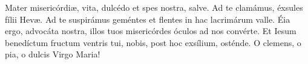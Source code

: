 Mater misericórdi{\ae}, vita, dulcédo et spes nostra, salve. Ad te clamámus, éxsules fílii Hev{\ae}.
Ad te suspirámus geméntes et flentes in hac lacrimárum valle. Éia ergo, advocáta nostra, illos tuos misericórdes óculos ad nos convérte.
Et Iesum benedíctum fructum ventris tui, nobis, post hoc exsílium, osténde. O clemens, o pia, o dulcis Virgo Maria!\\[2mm]
